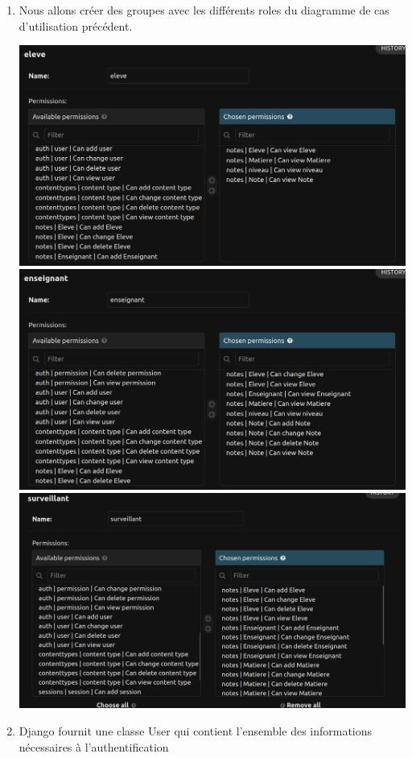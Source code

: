 \documentclass[11pt,a4paper]{article}
\begin{document}
\begin{enumerate}
\item Nous allons créer des groupes avec les différents roles du diagramme de cas d'utilisation précédent.
\begin{center}
\includegraphics[scale=0.3]{images/1.png}
\includegraphics[scale=0.3]{images/2.png}
\includegraphics[scale=0.3]{images/3.png}
\end{center}
\item Django fournit une classe User qui contient l’ensemble des informations nécessaires à l’authentification

\end{enumerate}
\end{document}
